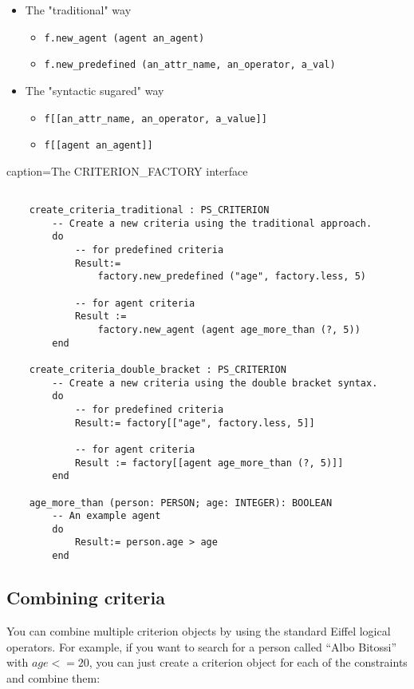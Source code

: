 \documentclass[a4paper,12pt]{report}
\begin{document}
 \begin{itemize}
  \item The "traditional" way
  \begin{itemize}
  \item \lstinline!f.new_agent (agent an_agent)!
  \item \lstinline!f.new_predefined (an_attr_name, an_operator, a_val)!
  \end{itemize}
  \item The "syntactic sugared" way
  \begin{itemize}
  \item \lstinline!f[[an_attr_name, an_operator, a_value]]!
  \item \lstinline!f[[agent an_agent]]!
  \end{itemize} 
  \end{itemize}
caption={The CRITERION\_FACTORY interface}
\begin{lstlisting}[language=OOSC2Eiffel, captionpos=b, caption={Different ways of creating criteria.}, label={lst:factory_usage}]

	create_criteria_traditional : PS_CRITERION
		-- Create a new criteria using the traditional approach.
		do
			-- for predefined criteria
			Result:= 
				factory.new_predefined ("age", factory.less, 5)

			-- for agent criteria
			Result := 
				factory.new_agent (agent age_more_than (?, 5))
		end

	create_criteria_double_bracket : PS_CRITERION
		-- Create a new criteria using the double bracket syntax.
		do
			-- for predefined criteria
			Result:= factory[["age", factory.less, 5]]

			-- for agent criteria
			Result := factory[[agent age_more_than (?, 5)]]
		end			

	age_more_than (person: PERSON; age: INTEGER): BOOLEAN
		-- An example agent
		do
			Result:= person.age > age
		end

\end{lstlisting}

\subsection{Combining criteria}

You can combine multiple criterion objects by using the standard Eiffel logical operators. 
For example, if you want to search for a person called ``Albo Bitossi'' with $age <= 20$, you can just create a criterion object for each of the constraints and combine them:  
\end{document}
